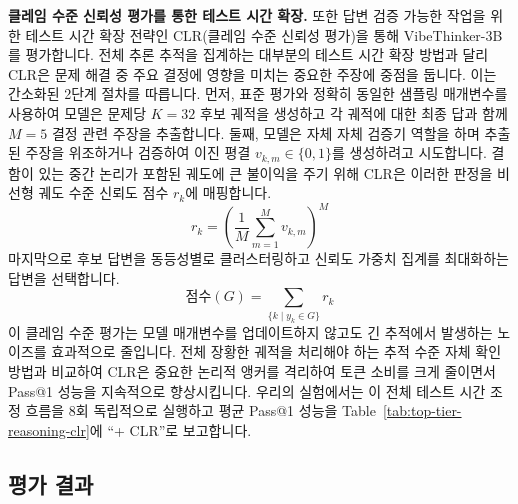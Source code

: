 \documentclass{article}
\begin{document}
\textbf{클레임 수준 신뢰성 평가를 통한 테스트 시간 확장.}
또한 답변 검증 가능한 작업을 위한 테스트 시간 확장 전략인 CLR(클레임 수준 신뢰성 평가)을 통해 VibeThinker-3B를 평가합니다. 전체 추론 추적을 집계하는 대부분의 테스트 시간 확장 방법과 달리 CLR은 문제 해결 중 주요 결정에 영향을 미치는 중요한 주장에 중점을 둡니다. 이는 간소화된 2단계 절차를 따릅니다. 먼저, 표준 평가와 정확히 동일한 샘플링 매개변수를 사용하여 모델은 문제당 $K=32$ 후보 궤적을 생성하고 각 궤적에 대한 최종 답과 함께 $M=5$ 결정 관련 주장을 추출합니다. 둘째, 모델은 자체 자체 검증기 역할을 하며 추출된 주장을 위조하거나 검증하여 이진 평결 $v_{k,m} \in \{0, 1\}$를 생성하려고 시도합니다. 결함이 있는 중간 논리가 포함된 궤도에 큰 불이익을 주기 위해 CLR은 이러한 판정을 비선형 궤도 수준 신뢰도 점수 $r_k$에 매핑합니다.
\begin{equation}
r_k = \left( \frac{1}{M} \sum_{m=1}^{M} v_{k,m} \right)^M
\end{equation}
마지막으로 후보 답변을 동등성별로 클러스터링하고 신뢰도 가중치 집계를 최대화하는 답변을 선택합니다.
\begin{equation}
\mathrm{점수}(G) = \sum_{\{k \mid y_k \in G\}} r_k
\end{equation}
이 클레임 수준 평가는 모델 매개변수를 업데이트하지 않고도 긴 추적에서 발생하는 노이즈를 효과적으로 줄입니다. 전체 장황한 궤적을 처리해야 하는 추적 수준 자체 확인 방법과 비교하여 CLR은 중요한 논리적 앵커를 격리하여 토큰 소비를 크게 줄이면서 Pass@1 성능을 지속적으로 향상시킵니다. 우리의 실험에서는 이 전체 테스트 시간 조정 흐름을 $8$회 독립적으로 실행하고 평균 Pass@1 성능을 Table~\ref{tab:top-tier-reasoning-clr}에 ``+ CLR''로 보고합니다.


\subsection{평가 결과}
\end{document}
